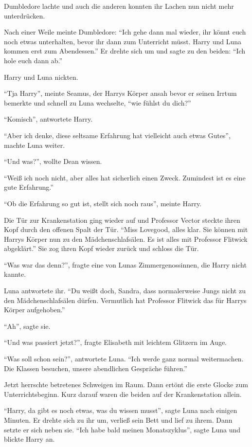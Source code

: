Dumbledore lachte und auch die anderen konnten ihr Lachen nun nicht mehr unterdrücken.

Nach einer Weile meinte Dumbledore: \enquote{Ich gehe dann mal wieder, ihr könnt euch noch etwas unterhalten, bevor ihr dann zum Unterricht müsst. Harry und Luna kommen erst zum Abendessen.} Er drehte sich um und sagte zu den beiden: \enquote{Ich hole euch dann ab.}

Harry und Luna nickten.

\enquote{Tja Harry}, meinte Seamus, der Harrys Körper ansah bevor er seinen Irrtum bemerkte und schnell zu Luna wechselte, \enquote{wie fühlst du dich?}

\enquote{Komisch}, antwortete Harry.

\enquote{Aber ich denke, diese seltsame Erfahrung hat vielleicht auch etwas Gutes}, machte Luna weiter.

\enquote{Und was?}, wollte Dean wissen.

\enquote{Weiß ich noch nicht, aber alles hat sicherlich einen Zweck. Zumindest ist es eine gute Erfahrung.}

\enquote{Ob die Erfahrung so gut ist, stellt sich noch raus}, meinte Harry.

Die Tür zur Krankenstation ging wieder auf und Professor Vector steckte ihren Kopf durch den offenen Spalt der Tür. \enquote{Miss Lovegood, alles klar. Sie können mit Harrys Körper nun zu den Mädchenschlafsälen. Es ist alles mit Professor Flitwick abgeklärt.} Sie zog ihren Kopf wieder zurück und schloss die Tür.

\enquote{Was war das denn?}, fragte eine von Lunas Zimmergenossinnen, die Harry nicht kannte.

Luna antwortete ihr. \enquote{Du weißt doch, Sandra, dass normalerweise Jungs nicht zu den Mädchenschlafsälen dürfen. Vermutlich hat Professor Flitwick das für Harrys Körper aufgehoben.}

\enquote{Ah}, sagte sie.

\enquote{Und was passiert jetzt?}, fragte Elisabeth mit leichtem Glitzern im Auge.

\enquote{Was soll schon sein?}, antwortete Luna. \enquote{Ich werde ganz normal weitermachen. Die Klassen besuchen, unsere abendlichen Gespräche führen.}

Jetzt herrschte betretenes Schweigen im Raum. Dann ertönt die erste Glocke zum Unterrichtsbeginn. Kurz darauf waren die beiden auf der Krankenstation allein.

\enquote{Harry, da gibt es noch etwas, was du wissen musst}, sagte Luna nach einigen Minuten. Er drehte sich zu ihr um, verließ sein Bett und lief zu ihrem. Dann setzte er sich neben sie. \enquote{Ich habe bald meinen Monatszyklus}, sagte Luna und blickte Harry an.

